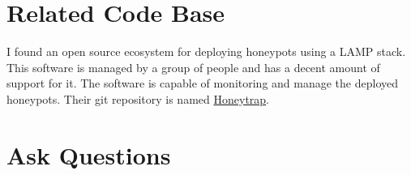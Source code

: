 \documentclass[journal]{IEEEtran}
\begin{document}
    \section{Related Code Base}
    \label{sec:code}
        I found an open source ecosystem for deploying honeypots using a LAMP stack.
        This software is managed by a group of people and has a decent amount of support for it.
        The software is capable of monitoring and manage the deployed honeypots.
        Their git repository is named \href{https://github.com/honeytrap/honeytrap}{Honeytrap}.

    \section{Ask Questions}


    \flushend
\end{document}

